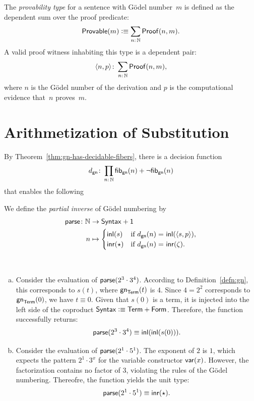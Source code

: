 \begin{defn}
    The \textsl{provability type} for a sentence with G\"odel number~$m$ is defined as the dependent sum over the proof predicate:
    \[
        \fun{Provable}(m)\defeq\sum_{n\colon\N}\fun{Proof}(n,m).
    \]
    A valid proof witness inhabiting this type is a dependent pair:
    \[
        \dep{n,p}\colon\sum_{n\colon\N}\fun{Proof}(n,m),
    \]
    where $n$ is the G\"odel number of the derivation and $p$ is the computational evidence that~$n$ proves~$m$.
\end{defn}


\section{Arithmetization of Substitution}

By Theorem~\ref{thm:gn-has-decidable-fibers}, there is a decision function
\[
    d_{\fun{gn}}\colon\prod_{n\colon\N}
        \fun{fib}_{\fun{gn}}(n)
        +
        \neg\fun{fib}_{\fun{gn}}(n)
\]
that enables the following

\begin{defn}
    We define the \textsl{partial inverse} of Gödel numbering by
    \begin{align*}
        \fun{parse}\colon\N&\to\fun{Syntax}+\fun1\\
        n&\mapsto\begin{cases}
            \fun{inl}(s)
                &\text{if }d_{\fun{gn}}(n)\eq{}\fun{inl}(\dep{s, p}),\\
            \fun{inr}(\fstar)
                &\text{if }d_{\fun{gn}}(n)\eq{}\fun{inr}(\zeta).
        \end{cases}
    \end{align*}
\end{defn}

\begin{xmpls}\ 
    \begin{enumerate}[a)]
        \item Consider the evaluation of $\mathsf{parse}(2^3\cdot3^4)$. According to Definition~\ref{defn:gn}, this corresponds to $s(t)$, where $\mathsf{gn}_{\mathsf{Term}}(t)$ is $4$. Since $4=2^2$ corresponds to $\mathsf{gn}_{\mathsf{Term}}(0)$, we have $t\equiv0$. Given that $s(0)$ is a term, it is injected into the left side of the coproduct $\mathsf{Syntax}\mathrel{\vcentcolon}\equiv\mathsf{Term}+\mathsf{Form}$. Therefore, the function successfully returns:
        \[
            \mathsf{parse}(2^3\cdot3^4)
                \equiv\mathsf{inl}(\mathsf{inl}(s(0))).
        \]    
    
        \item Consider the evaluation of $\mathsf{parse}(2^1\cdot5^1)$. The exponent of $2$ is $1$, which expects the pattern $2^1\cdot3^x$ for the variable constructor $\mathsf{var}(x)$. However, the factorization contains no factor of $3$, violating the rules of the G\"odel numbering. Thereofre, the function yields the unit type:
        \[
            \mathsf{parse}(2^1\cdot5^1)\equiv\mathsf{inr}({\mathsf{\star}}).
        \]
    \end{enumerate}
\end{xmpls}

